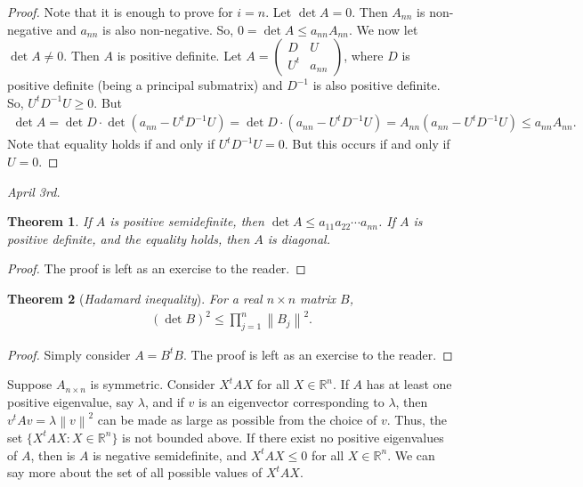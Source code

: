 \documentclass[15pt,a4paper]{book}
\newtheorem{theorem}{Theorem}[chapter]
\theoremstyle{definition}
\newcommand{\eax}[1]{\emph{#1}\index{#1}} %
\newcommand{\R}{\mathbb{R}}
\newcommand{\norm}[1]{\left\lVert#1\right\rVert}
\begin{document}
\begin{proof}
    Note that it is enough to prove for $i = n$. Let $\det A = 0$. Then $A_{nn}$ is non-negative and $a_{nn}$ is also non-negative. So, $0 = \det A \leq a_{nn}A_{nn}$. We now let $\det A \neq 0$. Then $A$ is positive definite. Let $A = \begin{pmatrix}
        D & U \\ U^{t} & a_{nn}
    \end{pmatrix}$, where $D$ is positive definite (being a principal submatrix) and $D^{-1}$ is also positive definite. So, $U^{t}D^{-1}U \geq 0$. But
    \begin{align}
        \det A = \det D \cdot \det (a_{nn}-U^{t}D^{-1}U) = \det D \cdot (a_{nn}-U^{t}D^{-1}U) = A_{nn}(a_{nn}-U^{t}D^{-1}U) \leq a_{nn}A_{nn}.
    \end{align}
    Note that equality holds if and only if $U^{t}D^{-1}U = 0$. But this occurs if and only if $U = 0$.
\end{proof}


\textit{April 3rd.}
\begin{theorem}
    If $A$ is positive semidefinite, then $\det A \leq a_{11}a_{22} \cdots a_{nn}$. If $A$ is positive definite, and the equality holds, then $A$ is diagonal.
\end{theorem}
\begin{proof}
    The proof is left as an exercise to the reader.
\end{proof}

\begin{theorem}[\eax{Hadamard inequality}]
    For a real $n \times n$ matrix $B$,
    \begin{align*}
        (\det B)^{2} \leq \prod_{j=1}^{n} \norm{B_{j}}^{2}.
    \end{align*}
\end{theorem}
\begin{proof}
    Simply consider $A = B^{t}B$. The proof is left as an exercise to the reader.
\end{proof}

Suppose $A_{n \times n}$ is symmetric. Consider $X^{t}AX$ for all $X \in \R^{n}$. If $A$ has at least one positive eigenvalue, say $\lambda$, and if $v$ is an eigenvector corresponding to $\lambda$, then $v^{t}Av = \lambda \norm{v}^{2}$ can be made as large as possible from the choice of $v$. Thus, the set $\{X^{t}AX : X \in \R^{n}\}$ is not bounded above. If there exist no positive eigenvalues of $A$, then is $A$ is negative semidefinite, and $X^{t}AX \leq 0$ for all $X \in \R^{n}$. We can say more about the set of all possible values of $X^{t}AX$.
\end{document}
